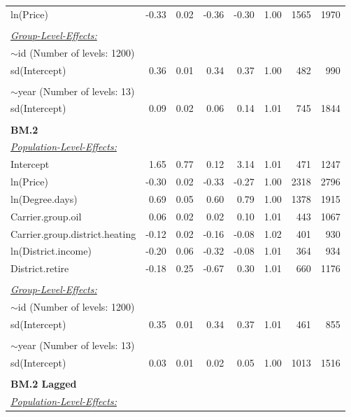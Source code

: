 \documentclass[12pt,twoside]{reedthesis}
\begin{document}
\begin{longtable}[c]{lrrrrrrr}
ln(Price) & -0.33 & 0.02 & -0.36 & -0.30 & 1.00 & 1565 & 1970 \\
 &  &  &  &  &  &  &  \\
{\ul \textit{Group-Level-Effects:}} &  &  &  &  &  &  &  \\
$\sim$id (Number of levels: 1200) &  &  &  &  &  &  &  \\
sd(Intercept) & 0.36 & 0.01 & 0.34 & 0.37 & 1.00 & 482 & 990 \\
 &  &  &  &  &  &  &  \\
$\sim$year (Number of levels: 13) &  &  &  &  &  &  &  \\
sd(Intercept) & 0.09 & 0.02 & 0.06 & 0.14 & 1.01 & 745 & 1844 \\ \hline
 &  &  &  &  &  &  &  \\ \hline
\textbf{BM.2} &  &  &  &  &  &  &  \\
{\ul \textit{Population-Level-Effects:}} &  &  &  &  &  &  &  \\
Intercept & 1.65 & 0.77 & 0.12 & 3.14 & 1.01 & 471 & 1247 \\
ln(Price) & -0.30 & 0.02 & -0.33 & -0.27 & 1.00 & 2318 & 2796 \\
ln(Degree.days) & 0.69 & 0.05 & 0.60 & 0.79 & 1.00 & 1378 & 1915 \\
Carrier.group.oil & 0.06 & 0.02 & 0.02 & 0.10 & 1.01 & 443 & 1067 \\
Carrier.group.district.heating & -0.12 & 0.02 & -0.16 & -0.08 & 1.02 & 401 & 930 \\
ln(District.income) & -0.20 & 0.06 & -0.32 & -0.08 & 1.01 & 364 & 934 \\
District.retire & -0.18 & 0.25 & -0.67 & 0.30 & 1.01 & 660 & 1176 \\
 &  &  &  &  &  &  &  \\
{\ul \textit{Group-Level-Effects:}} &  &  &  &  &  &  &  \\
$\sim$id (Number of levels: 1200) &  &  &  &  &  &  &  \\
sd(Intercept) & 0.35 & 0.01 & 0.34 & 0.37 & 1.01 & 461 & 855 \\
 &  &  &  &  &  &  &  \\
$\sim$year (Number of levels: 13) &  &  &  &  &  &  &  \\
sd(Intercept) & 0.03 & 0.01 & 0.02 & 0.05 & 1.00 & 1013 & 1516 \\ \hline
 &  &  &  &  &  &  &  \\ \hline
\textbf{BM.2 Lagged} &  &  &  &  &  &  &  \\
{\ul \textit{Population-Level-Effects:}} &  &  &  &  &  &  &  \\

\end{longtable}
\end{document}

